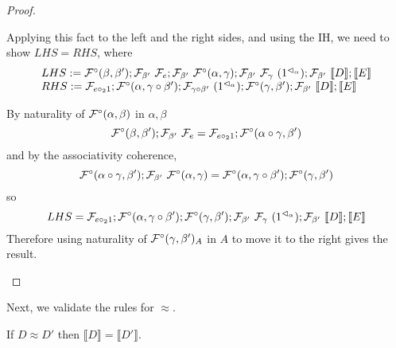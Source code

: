 \documentclass{drl-common/llncs}
\renewcommand{\sem}[1]{\ensuremath{ \llbracket #1 \rrbracket}}
\newcommand\compo[2]{\ensuremath{#1 \circ #2}}
\newcommand\comph[2]{\ensuremath{#1 \mathbin{\circ_2} #2}}
\newcommand\ap[2]{\ensuremath{#1 \approx #2}}
\begin{document}
\begin{proof}
\begin{itemize}
Applying this fact to the left and the right sides, and using the IH, we
need to show $LHS = RHS$, where
\[
\begin{array}{l}
LHS :=
\semFcomp(\beta,\beta');\semF{\beta'}{\semFo{e}};\semF{\beta'}{\semFcomp(\alpha,\gamma)};\semF{\beta'}{\semF{\gamma}{(\semrtol
    1 \alpha)}};\semF{\beta'}{\sem D};\sem{E}\\
RHS :=
\semFo{\comph{e}{1}};\semFcomp(\alpha,\compo{\gamma}{\beta'});\semF{\compo{\gamma}{\beta'}}{(\semrtol{1}{\alpha})};\semFcomp(\gamma,\beta');\semF{\beta'}{\sem D};\sem{E}
\end{array}
\]

By naturality of $\mathcal{F}^\circ(\alpha,\beta)$ in $\alpha,\beta$
\[
\semFcomp(\beta,\beta');\semF{\beta'}{\semFo{e}} = \semFo{\comph{e}{1}};\semFcomp(\compo{\alpha}{\gamma},\beta')
\]
and by the associativity coherence, 
\[
\semFcomp(\compo{\alpha}{\gamma},\beta');\semF{\beta'}{\semFcomp(\alpha,\gamma)}
= 
\semFcomp(\alpha,\compo{\gamma}{\beta'});\semFcomp(\gamma,\beta')
\]
so 
\[
LHS = 
\semFo{\comph{e}{1}};
\semFcomp(\alpha,\compo{\gamma}{\beta'});\semFcomp(\gamma,\beta')
;\semF{\beta'}{\semF{\gamma}{(\semrtol
    1 \alpha)}};\semF{\beta'}{\sem D};\sem{E}
\]
Therefore using naturality of $\mathcal{F}^\circ(\gamma,\beta')_A$ in $A$ to
move it to the right gives the result. 
\end{itemize}
\end{proof}

Next, we validate the rules for \ap{}{}.  

\begin{theorem} If \ap{D}{D'} then $\sem{D} = \sem{D'}$.  
\end{theorem}
\end{document}
